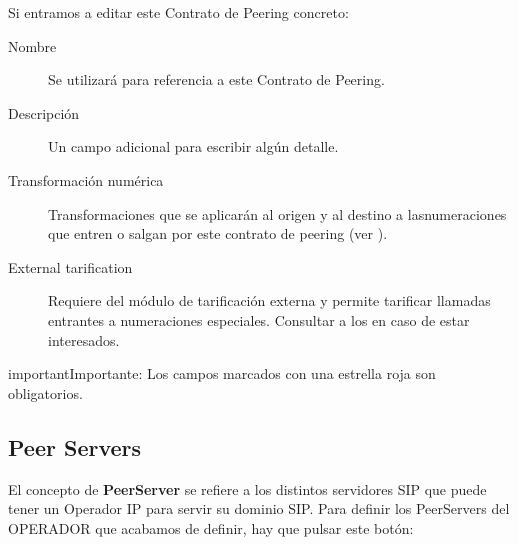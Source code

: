 \documentclass[letterpaper,10pt,spanish]{sphinxmanual}
\begin{document}

Si entramos a editar este Contrato de Peering concreto:

\begin{description}
\item[{Nombre}] \leavevmode{}\label{external_incoming_calls/peering_contracts:term-name}
Se utilizará para referencia a este Contrato de Peering.

\item[{Descripción}] \leavevmode{}\label{external_incoming_calls/peering_contracts:term-description}
Un campo adicional para escribir algún detalle.

\item[{Transformación numérica}] \leavevmode{}\label{external_incoming_calls/peering_contracts:term-numeric-transformation}
Transformaciones que se aplicarán al origen y al destino a lasnumeraciones que entren o salgan por este contrato de peering (ver {\hyperref[external_incoming_calls/numeric_transformations:numeric\string-transformations]{}}).

\item[{External tarification}] \leavevmode{}\label{external_incoming_calls/peering_contracts:term-external-tarification}
Requiere del módulo de tarificación externa y permite tarificar llamadas entrantes a numeraciones especiales. Consultar a los {\hyperref[intro/getting_help:getting\string-help]{}} en caso de estar interesados.

\end{description}

\begin{notice}{important}{Importante:}
Los campos marcados con una estrella roja son obligatorios.
\end{notice}


\subsection{Peer Servers}
\label{external_incoming_calls/peering_contracts:peer-servers}
El concepto de \textbf{PeerServer} se refiere a los distintos servidores SIP que puede tener un Operador IP para servir su dominio SIP. Para definir los PeerServers del OPERADOR que acabamos de definir, hay que pulsar este botón:
\end{document}
